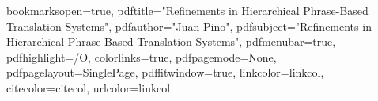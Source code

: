 \usepackage[table]{xcolor}
\usepackage{graphicx}
\usepackage{rotating}
\usepackage{algorithm}
\usepackage{algpseudocode}
\usepackage{fixltx2e}
\usepackage{varwidth}
\usepackage{amsmath}
\usepackage{amsfonts}
\usepackage{bbding}
\usepackage[round]{natbib}
\usepackage{bm}
\usepackage[utf8]{inputenc}
\usepackage[T1,T2A]{fontenc} %
\usepackage{CJKutf8}
\def\pgfsysdriver{pgfsys-dvipdfm.def}
\usepackage{tikz}
\usetikzlibrary{calc,fit,shapes,arrows,positioning,automata}
\usepackage[dvipdfm,a4paper,pagebackref,hyperindex=true]{hyperref}
\usepackage[all]{hypcap}
\usepackage{footnotebackref}

\setcounter{secnumdepth}{3}

\newcommand{\red}[1]{\textcolor{red}{#1}}
\def \RT [#1][#2][#3]{#1$\rightarrow${\tt $\langle$}#2,#3{\tt $\rangle$}}
\def \SR [#1]{ {\tt $\langle$}#1}
\def \TR [#1]{ #1{\tt $\rangle$}}
\def \RU [#1][#2]{ {\tt $\langle$}#1,#2{\tt $\rangle$}}


\MakeRobust{\Call}

\renewcommand{\eqref}[1]{Equation~(\ref{#1})}

\newcommand{\secref}[1]{Section~(\ref{#1})}


\hypersetup
{
bookmarksopen=true,
pdftitle="Refinements in Hierarchical Phrase-Based Translation Systems",
pdfauthor="Juan Pino", 
pdfsubject="Refinements in Hierarchical Phrase-Based Translation Systems", %
pdfmenubar=true, %
pdfhighlight=/O, %
colorlinks=true, %
pdfpagemode=None, %
pdfpagelayout=SinglePage, %
pdffitwindow=true, %
linkcolor=linkcol, %
citecolor=citecol, %
urlcolor=linkcol %
}

\def\chapterautorefname{Chapter}
\def\sectionautorefname{Section}
\def\subsectionautorefname{Section}
\def\subsubsectionautorefname{Section}
\def\paragraphautorefname{Section}
\def\algorithmautorefname{Algorithm}

\DeclareMathOperator*{\argmin}{argmin}
\DeclareMathOperator*{\argmax}{argmax}

%

%
%
%
%
%
%
%
